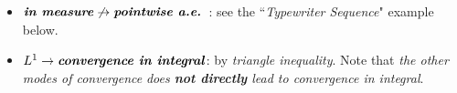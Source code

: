 \documentclass[11pt]{article}
\begin{document}
\begin{itemize}
\begin{remark}
\begin{itemize}
\item $\text{\emph{\textbf{in measure}}} \not\rightarrow \text{\emph{\textbf{pointwise a.e.}} }$: see the ``\emph{Typewriter Sequence}" example below.
\item $L^{1}  \rightarrow \text{\emph{\textbf{convergence in integral}}}$:  by \emph{triangle inequality}. Note that \emph{the other modes of convergence} \emph{does \textbf{not directly} lead to convergence in integral}.
\end{itemize} 
\end{remark}
\end{itemize}
\end{document}
